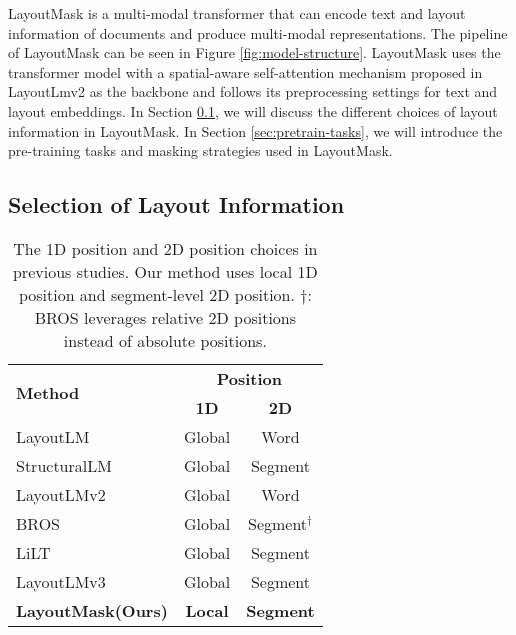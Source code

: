 \documentclass[11pt]{article}
\begin{document}
LayoutMask is a multi-modal transformer that can encode text and layout information of documents and produce multi-modal representations.
The pipeline of LayoutMask can be seen in Figure \ref{fig:model-structure}.
LayoutMask uses the transformer model with a spatial-aware self-attention mechanism proposed in LayoutLmv2 \citep{xu2021layoutlmv2} as the backbone and follows its preprocessing settings for text and layout embeddings.  
In Section \ref{sec:selection-layout}, we will discuss the different choices of layout information in LayoutMask.
In Section \ref{sec:pretrain-tasks}, we will introduce the pre-training tasks and masking strategies used in LayoutMask.

\subsection{Selection of Layout Information}
\label{sec:selection-layout}

\begin{table}[]
\footnotesize
\begin{tabular}{l|cc}
\hline
\multirow{2}{*}{\textbf{Method} } & \multicolumn{2}{c}{\textbf{Position}} \\ \cline{2-3}
     & \textbf{1D} & \textbf{2D} \\ \hline

LayoutLM  \citep{xu2020layoutlm}        & Global          & Word         \\

StructuralLM \citep{li2021structurallm}       & Global        & Segment       \\
LayoutLMv2  \citep{xu2021layoutlmv2}      & Global        & Word         \\
BROS   \citep{hong2022bros}        & Global          & Segment$^{\dag}$       \\
LiLT  \citep{wang2022lilt}         & Global        & Segment       \\
LayoutLMv3   \citep{huang2022layoutlmv3}      & Global        & Segment       \\ \hline
\textbf{LayoutMask(Ours)} & \textbf{Local}    & \textbf{Segment}   \\ \hline
\end{tabular}
\caption{\label{table:survey-of-positions}
The 1D position and 2D position choices in previous studies. Our method uses local 1D position and segment-level 2D position. $\dag$: BROS leverages relative 2D positions instead of absolute positions.
}
\end{table}
\end{document}
